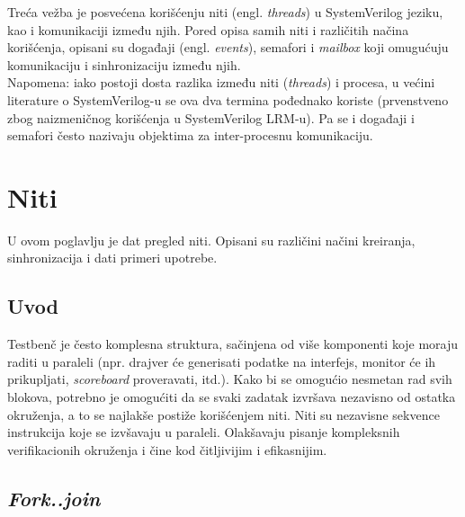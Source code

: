 %
% 

Treća vežba je posvećena korišćenju niti (engl. \emph{threads}) u SystemVerilog
jeziku, kao i komunikaciji između njih. Pored opisa samih niti i različitih
načina korišćenja, opisani su događaji (engl. \emph{events}), semafori i
\emph{mailbox} koji omugućuju komunikaciju i sinhronizaciju između njih.\\

Napomena: iako postoji dosta razlika između niti (\emph{threads}) i procesa, u
većini literature o SystemVerilog-u se ova dva termina pođednako koriste
(prvenstveno zbog naizmeničnog korišćenja u SystemVerilog LRM-u). Pa se i
događaji i semafori često nazivaju objektima za inter-procesnu komunikaciju.


\section{Niti}

U ovom poglavlju je dat pregled niti. Opisani su različini načini kreiranja,
sinhronizacija i dati primeri upotrebe.


\subsection{Uvod}

Testbenč je često komplesna struktura, sačinjena od više komponenti koje moraju
raditi u paraleli (npr. drajver će generisati podatke na interfejs, monitor će
ih prikupljati, \emph{scoreboard} proveravati, itd.). Kako bi se omogućio
nesmetan rad svih blokova, potrebno je omogućiti da se svaki zadatak izvršava
nezavisno od ostatka okruženja, a to se najlakše postiže korišćenjem niti. Niti
su nezavisne sekvence instrukcija koje se izvšavaju u paraleli. Olakšavaju
pisanje kompleksnih verifikacionih okruženja i čine kod čitljivijim i
efikasnijim.


\subsection{\emph{Fork..join}}

